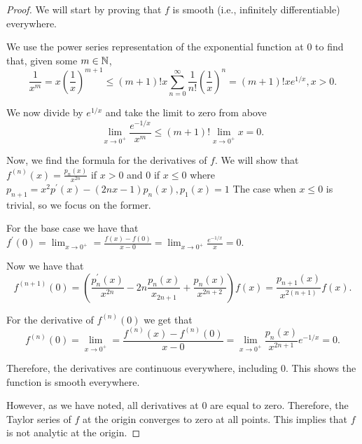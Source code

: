 \documentclass[twoside]{article}
\begin{document}
    \begin{proof}
        We will start by proving that $f$ is smooth (i.e., infinitely differentiable)
        everywhere.

        We use the power series representation of the exponential function at 0 to find that,
        given some $m \in \mathbb{N}$,
        \begin{equation*}
            \frac{1}{x^{m}} = x\left(\frac{1}{x}\right)^{m + 1} 
            \leq (m + 1)! x \sum_{n = 0}^{\infty}\frac{1}{n!}\left(\frac{1}{x}\right)^{n}
            = (m + 1)!xe^{1/x}, x > 0.
        \end{equation*}

        We now divide by $e^{1/x}$ and take the limit to zero from above
        \begin{equation*}
            \lim_{x \to 0^{+}} \frac{e^{-1/x}}{x^{m}} \leq (m + 1)!\lim_{x \to 0^{+}}x = 0.
        \end{equation*}

        Now, we find the formula for the derivatives of $f$.
        We will show that $f^{(n)}(x) = \frac{p_{n}(x)}{x^{2n}}$ if $x > 0$ and 0 if $x \leq 0$ 
        where $p_{n + 1} = x^{2}p^{\prime}(x) - (2nx - 1)p_{n}(x), p_{1}(x) = 1$
        The case when $x \leq 0$ is trivial, so we focus on the former.

        For the base case we have that 
        $f^{\prime}(0) = \lim_{x \to 0^{+}} = \frac{f(x) - f(0)}{x - 0} = 
        \lim_{x \to 0^{+}} \frac{e^{-1/x}}{x} = 0$.

        Now we have that
        \begin{equation*}
            f^{(n + 1)}(0) = \left(\frac{p^{\prime}_{n}(x)}{x^{2n}} - 2n \frac{p_{n}(x)}{x_{2n + 1}}
                + \frac{p_{n}(x)}{x^{2n+2}}\right)f(x) = \frac{p_{n+1}(x)}{x^{2(n+1)}}f(x).
        \end{equation*}

        For the derivative of $f^{(n)}(0)$ we get that
        \begin{equation*}
            f^{(n)}(0) = \lim_{x \to 0^{+}} = \frac{f^{(n)}(x) - f^{(n)}(0)}{x - 0} = 
            \lim_{x \to 0^{+}} \frac{p_{n}(x)}{x^{2n + 1}}e^{-1/x} = 0.
        \end{equation*}

        Therefore, the derivatives are continuous everywhere, including 0.
        This shows the function is smooth everywhere.

        However, as we have noted, all derivatives at 0 are equal to zero.
        Therefore, the Taylor series of $f$ at the origin converges to 
        zero at all points. This implies that $f$ is not analytic at the origin.
    \end{proof}
\end{document}
